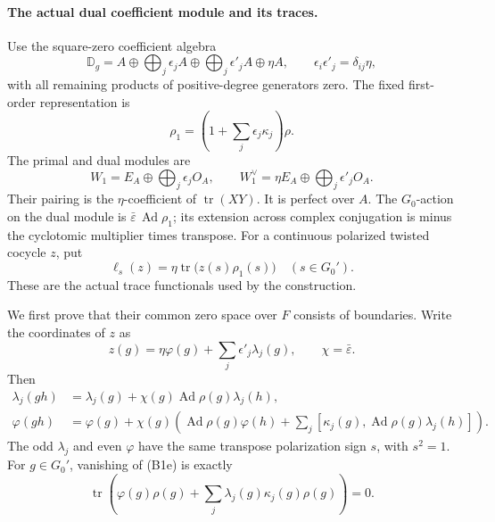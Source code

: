 \paragraph{The actual dual coefficient module and its traces.}
Use the square-zero coefficient algebra
\[
 {\mathbb D}_g=A\oplus\bigoplus_j\epsilon_jA
                   \oplus\bigoplus_j\epsilon'_jA\oplus\eta A,
 \qquad \epsilon_i\epsilon'_j=\delta_{ij}\eta,
\]
with all remaining products of positive-degree generators zero.
The fixed first-order representation is
\[
                   \rho_1=(1+\sum_j\epsilon_j\kappa_j)\rho .
\]
The primal and dual modules are
\[
 W_1=E_A\oplus\bigoplus_j\epsilon_jO_A,\qquad
 W_1^\vee=\eta E_A\oplus\bigoplus_j\epsilon'_jO_A.
 \tag{B1d}
\]
Their pairing is the \(\eta\)-coefficient of \(\operatorname{tr}(XY)\).
It is perfect over \(A\).
The \(G_0\)-action on the dual module is
\(\bar\varepsilon\,\operatorname{Ad}\rho_1\); its extension across
complex conjugation is minus the cyclotomic multiplier times
transpose.
For a continuous polarized twisted cocycle \(z\), put
\[
             \ell_s(z)=
       \eta\operatorname{tr}\bigl(z(s)\rho_1(s)\bigr)
                         \quad(s\in G_0').
 \tag{B1e}
\]
These are the actual trace functionals used by the construction.

We first prove that their common zero space over \(F\) consists
of boundaries.
Write the coordinates of \(z\) as
\[
                 z(g)=\eta\varphi(g)
                              +\sum_j\epsilon'_j\lambda_j(g),
 \qquad \chi=\bar\varepsilon .
\]
Then
\[
 \begin{split}
 \lambda_j(gh)&=\lambda_j(g)+
                  \chi(g)\operatorname{Ad}\rho(g)\lambda_j(h),\\
 \varphi(gh)&=\varphi(g)+\chi(g)\left(
       \operatorname{Ad}\rho(g)\varphi(h)+
       \sum_j[\kappa_j(g),
                     \operatorname{Ad}\rho(g)\lambda_j(h)]\right).
 \end{split}
 \tag{B1f}
\]
The odd \(\lambda_j\) and even \(\varphi\) have the same transpose
polarization sign \(s\), with \(s^2=1\).
For \(g\in G_0'\), vanishing of (B1e) is exactly
\[
       \operatorname{tr}\left(
        \varphi(g)\rho(g)+
                \sum_j\lambda_j(g)\kappa_j(g)\rho(g)\right)=0 .
 \tag{B1g}
\]

